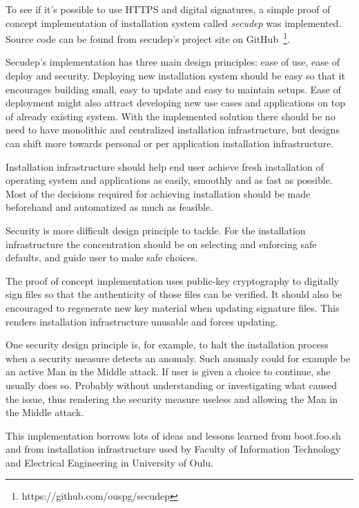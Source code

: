 
To see if it's possible to use HTTPS and digital signatures, a simple
proof of concept implementation of installation system
called \emph{secudep} was implemented. Source code can be found from
secudep's project site on
GitHub~\footnote{https://github.com/ouspg/secudep}.

Secudep's implementation has three main design principles: ease of
use, ease of deploy and security. Deploying new installation system
should be easy so that it encourages building small, easy to update
and easy to maintain setups. Ease of deployment might also attract
developing new use cases and applications on top of already existing
system. With the implemented solution there should be no need to have
monolithic and centralized installation infrastructure, but designs
can shift more towards personal or per application installation
infrastructure.

Installation infrastructure should help end user achieve fresh
installation of operating system and applications as easily, smoothly
and as fast as possible. Most of the decisions required for achieving
installation should be made beforehand and automatized as much as
feasible.

Security is more difficult design principle to tackle. For the
installation infrastructure the concentration should be on selecting
and enforcing safe defaults, and guide user to make safe choices.

The proof of concept implementation uses public-key cryptography to
digitally sign files so that the authenticity of those files can be
verified. It should also be encouraged to regenerate new key material
when updating signature files. This renders installation
infrastructure unusable and forces updating.

One security design principle is, for example, to halt the
installation process when a security measure detects an anomaly. Such
anomaly could for example be an active Man in the Middle attack. If
user is given a choice to continue, she usually does so. Probably
without understanding or investigating what caused the issue, thus
rendering the security measure useless and allowing the Man in the
Middle attack.

This implementation borrows lots of ideas and lessons learned from
boot.foo.sh\cite{boot-foo-sh} and from installation infrastructure
used by Faculty of Information Technology and Electrical Engineering
in University of Oulu.

